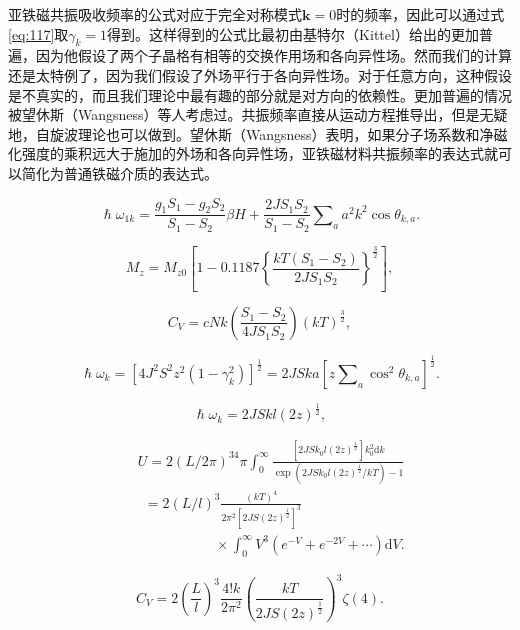\documentclass{article}
\begin{document}
亚铁磁共振吸收频率的公式对应于完全对称模式$\mathbf{k}=0$时的频率，因此可以通过式\eqref{eq:117}取$\gamma_k=1$得到。这样得到的公式比最初由基特尔（Kittel）给出的更加普遍，因为他假设了两个子晶格有相等的交换作用场和各向异性场。然而我们的计算还是太特例了，因为我们假设了外场平行于各向异性场。对于任意方向，这种假设是不真实的，而且我们理论中最有趣的部分就是对方向的依赖性。更加普遍的情况被望休斯（Wangsness）等人考虑过。共振频率直接从运动方程推导出，但是无疑地，自旋波理论也可以做到。望休斯（Wangsness）表明，如果分子场系数和净磁化强度的乘积远大于施加的外场和各向异性场，亚铁磁材料共振频率的表达式就可以简化为普通铁磁介质的表达式。



\begin{equation} \label{eq:119}
\hslash\omega_{1k}=\frac{g_1S_1-g_2S_2}{S_1-S_2}\beta H+\frac{2JS_1S_2}{S_1-S_2}\sum\nolimits_aa^2k^2\cos\theta_{k,a}.
\end{equation}

\begin{equation} \label{eq:120}
M_z=M_{z0}\left[1-0.1187\left\{\frac{kT(S_1-S_2)}{2JS_1S_2}\right\}^\frac{3}{2}\right],
\end{equation} 

\begin{equation} \label{eq:121}
C_V=cNk\left(\frac{S_1-S_2}{4JS_1S_2}\right)(kT)^\frac{3}{2},
\end{equation}

\begin{equation} \label{eq:122}
\hslash\omega_k=[4J^2S^2z^2(1-\gamma_k^2)]^\frac{1}{2}=2JSka[z\sum\nolimits_a\cos^2\theta_{k,a}]^\frac{1}{2}.
\end{equation}

\begin{equation} \label{eq:123}
\hslash\omega_k=2JSkl(2z)^\frac{1}{2},
\end{equation}

\begin{eqnarray} \label{eq:124}
&&U=2(L/2\pi)^34\pi\int_0^\infty\frac{[2JSk_0l(2z)^\frac{1}{2}]k_0^2\mathrm{d}k}{\exp(2JSk_0l(2z)^\frac{1}{2}/kT)-1}\nonumber\\
&&~~=2(L/l)^3\frac{(kT)^4}{2\pi^2[2JS(2z)^\frac{1}{2}]^3}\\
&&~~~~~~~~~~~~~~~~~~~~~~~~~\times\int_0^\infty V^3(e^{-V}+e^{-2V}+\cdots)\mathrm{d}V.\nonumber
\end{eqnarray}

\begin{equation} \label{eq:125}
C_V=2\left(\frac{L}{l}\right)^3\frac{4!k}{2\pi^2}\left(\frac{kT}{2JS(2z)^\frac{1}{2}}\right)^3\zeta(4).
\end{equation}
\end{document}
